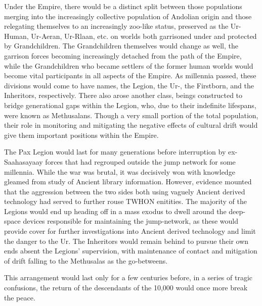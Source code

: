 Under the Empire, there would be a distinct split between those populations merging into the increasingly collective population of Andolian origin and those relegating themselves to an increasingly zoo-like status, preserved as the Ur-Human, Ur-Aeran, Ur-Rlaan, etc. on worlds both garrisoned under and protected by Grandchildren. The Grandchildren themselves would change as well, the garrison forces becoming increasingly detached from the path of the Empire, while the Grandchildren who became settlers of the former human worlds would become vital participants in all aspects of the Empire. As millennia passed, these divisions would come to have names, the Legion, the Ur-, the Firstborn, and the Inheritors, respectively. There also arose another class, beings constructed to bridge generational gaps within the Legion, who, due to their indefinite lifespans, were known as Methusalans. Though a very small portion of the total population, their role in monitoring and mitigating the negative effects of cultural drift would give them important positions within the Empire.

The Pax Legion would last for many generations before interruption by ex-Saahasayaay forces that had regrouped outside the jump network for some millennia. While the war was brutal, it was decisively won with knowledge gleamed from study of Ancient library information. However, evidence mounted that the aggression between the two sides both using vaguely Ancient derived technology had served to further rouse TWHON enitities. The majority of the Legions would end up heading off in a mass exodus to dwell around the deep-space devices responsible for maintaining the jump-network, as these would provide cover for further investigations into Ancient derived technology and limit the danger to the Ur. The Inheritors would remain behind to pursue their own ends absent the Legions’ supervision, with maintenance of contact and mitigation of drift falling to the Methusalas as the go-betweens.

This arrangement would last only for a few centuries before, in a series of tragic confusions, the return of the descendants of the 10,000 would once more break the peace.


